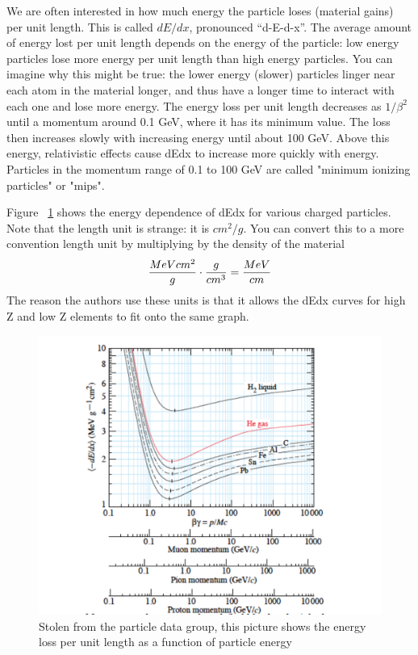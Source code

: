 We are often interested in how much energy the particle loses (material gains) per unit length.  This is called $dE/dx$, pronounced ``d-E-d-x''.    The average amount of energy lost per unit length depends on the energy of the particle: low energy particles lose more energy per unit length than high energy particles.  You can imagine why this might be true: the lower energy (slower) particles linger near each atom in the material longer, and thus have a longer time to interact with each one and lose more energy.  The energy loss per unit length decreases as $1/\beta^2$ until a momentum around 0.1 GeV, where it has its minimum value.  The loss then increases slowly with increasing energy until about 100 GeV.  Above this energy, relativistic effects cause dEdx to increase more quickly with energy.  Particles in the momentum range of 0.1 to 100 GeV are called "minimum ionizing particles" or "mips".

Figure ~\ref{fig:pdgdedx} shows the energy dependence of dEdx for various charged particles.  Note that the length unit is strange: it is $cm^2/g$.  You can convert this to a more convention length unit by multiplying by the density of the material
\begin{equation}
{{MeV cm^2}\over{g}} \cdot {{g}\over{cm^3}} = {{MeV}\over{cm}}
\end{equation}
The reason the authors use these units is that it allows the dEdx curves for high Z and low Z elements to fit onto the same graph.

\begin{figure}[h]
\centering\includegraphics[scale=0.5]{./particleinteractions/Pictures/dedx.pdf}
\caption{Stolen from the particle data group, this picture shows the energy
loss per unit length as a function of particle energy}
\label{fig:pdgdedx}
\end{figure}


